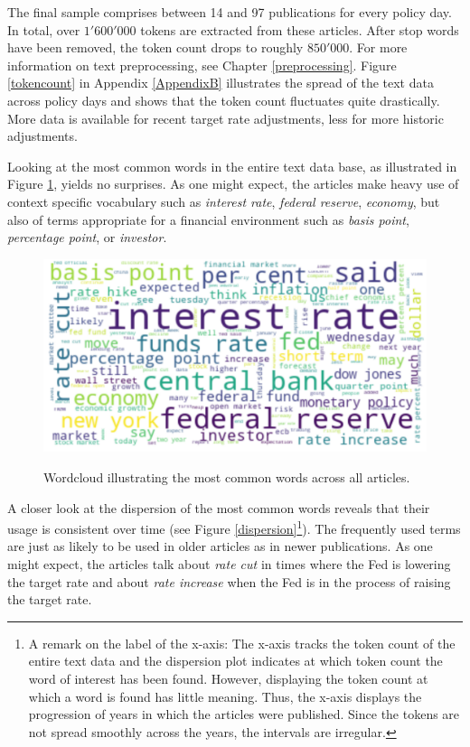 \documentclass[11pt,a4paper,english,oneside]{book}
\numberwithin{equation}{chapter}
\begin{document}
The final sample comprises between 14 and 97 publications for every policy day. In total, over $1'600'000$ tokens are extracted from these articles. After stop words have been removed, the token count drops to roughly $850'000$. For more information on text preprocessing, see Chapter \ref{preprocessing}. Figure \ref{tokencount} in Appendix \ref{AppendixB} illustrates the spread of the text data across policy days and shows that the token count fluctuates quite drastically. More data is available for recent target rate adjustments, less for more historic adjustments.

Looking at the most common words in the entire text data base, as illustrated in Figure \ref{wcloud}, yields no surprises. As one might expect, the articles make heavy use of context specific vocabulary such as \textit{interest rate}, \textit{federal reserve}, \textit{economy}, but also of terms appropriate for a financial environment such as \textit{basis point}, \textit{percentage point}, or \textit{investor}. %

\begin{figure}
	\caption{Wordcloud illustrating the most common words across all articles.}
	\centering
	\includegraphics[scale=0.2]{Images/wordcloud.pdf}
	\label{wcloud}
\end{figure}

A closer look at the dispersion of the most common words reveals that their usage is consistent over time (see Figure \ref{dispersion}\footnote{A remark on the label of the x-axis: The x-axis tracks the token count of the entire text data and the dispersion plot indicates at which token count the word of interest has been found. However, displaying the token count at which a word is found has little meaning. Thus, the x-axis displays the progression of years in which the articles were published. Since the tokens are not spread smoothly across the years, the intervals are irregular.}). The frequently used terms are just as likely to be used in older articles as in newer publications. As one might expect, the articles talk about \textit{rate cut} in times where the Fed is lowering the target rate and about \textit{rate increase} when the Fed is in the process of raising the target rate.
\end{document}
